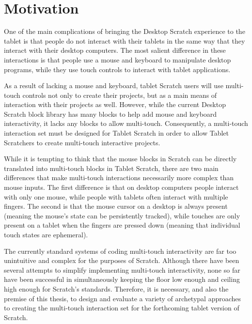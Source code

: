 \section{Motivation}

One of the main complications of bringing the Desktop Scratch experience to the tablet is that people do not interact with their tablets in the same way that they interact with their desktop computers. The most salient difference in these interactions is that people use a mouse and keyboard to manipulate desktop programs, while they use touch controls to interact with tablet applications.

As a result of lacking a mouse and keyboard, tablet Scratch users will use multi-touch controls not only to create their projects, but as a main means of interaction with their projects as well. However, while the current Desktop Scratch block library has many blocks to help add mouse and keyboard interactivity, it lacks any blocks to allow multi-touch. Consequently, a multi-touch interaction set must be designed for Tablet Scratch in order to allow Tablet Scratchers to create multi-touch interactive projects.

While it is tempting to think that the mouse blocks in Scratch can be directly translated into multi-touch blocks in Tablet Scratch, there are two main differences that make multi-touch interactions necessarily more complex than mouse inputs. The first difference is that on desktop computers people interact with only one mouse, while people with tablets often interact with multiple fingers. The second is that the mouse cursor on a desktop is always present (meaning the mouse's state can be persistently tracked), while touches are only present on a tablet when the fingers are pressed down (meaning that individual touch states are ephemeral).

The currently standard systems of coding multi-touch interactivity are far too unintuitive and complex for the purposes of Scratch. Although there have been several attempts to simplify implementing multi-touch interactivity, none so far have been successful in simultaneously keeping the floor low enough and ceiling high enough for Scratch's standards. Therefore, it is necessary, and also the premise of this thesis, to design and evaluate a variety of archetypal approaches to creating the multi-touch interaction set for the forthcoming tablet version of Scratch.

